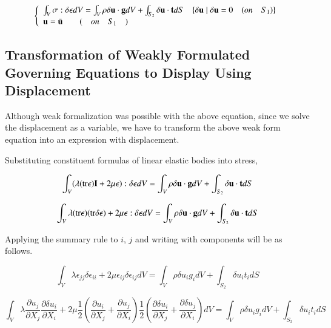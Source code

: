 \begin {tcolorbox}[title=Weakly Formulated Governing Equation]
\begin{equation}
\left\{\begin{array}{l}\int_V\mathbf{\sigma}:\delta\mathbf{\epsilon}dV=\int_V\rho\delta\mathbf{u}\cdot\mathbf{g}dV+\int_{S_2}\delta\mathbf{u}\cdot\mathbf{t}dS\quad\{ \delta\mathbf{u} \mid \delta\mathbf{u}=0 \quad (on \quad S_1) \}\\ \mathbf{u}=\bar{\mathbf{u}}\qquad (\quad on \quad S_1 \quad)\end{array}\right.
\end{equation}
\end{tcolorbox}

\subsection{Transformation of Weakly Formulated Governing Equations to Display Using Displacement}


Although weak formalization was possible with the above equation, since we solve the displacement as a variable, we have to transform the above weak form equation into an expression with displacement.

Substituting constituent formulas of linear elastic bodies into stress,

\begin{equation}
\int_V(\lambda({\rm tr}\mathbf{\epsilon})\mathbf{I}+2\mu\mathbf{\epsilon}):\delta\mathbf{\epsilon}dV=\int_V\rho\delta\mathbf{u}\cdot\mathbf{g}dV+\int_{S_2}\delta\mathbf{u}\cdot\mathbf{t}dS
\end{equation}

\begin{equation}
\int_V \lambda({\rm tr}\mathbf{\epsilon})({\rm tr}\mathbf{\delta\epsilon})+2\mu\mathbf{\epsilon}:\delta\mathbf{\epsilon}dV=\int_V\rho\delta\mathbf{u}\cdot\mathbf{g}dV+\int_{S_2}\delta\mathbf{u}\cdot\mathbf{t}dS
\end{equation}

Applying the summary rule to $i$, $j$ and writing with components will be as follows.

\begin{equation}
\int_V \lambda\epsilon_{jj}\delta\epsilon_{ii}+2\mu\epsilon_{ij}\delta\epsilon_{ij}dV=\int_V\rho\delta u_i g_idV+\int_{S_2}\delta u_i t_idS
\end{equation}

\begin{equation}
\int_V \lambda\frac{\partial u_j}{\partial X_j}\frac{\partial \delta u_i}{\partial X_i}+2\mu\frac{1}{2}\left(\frac{\partial u_i}{\partial X_j}+\frac{\partial u_j}{\partial X_i}\right)\frac{1}{2}\left(\frac{\partial \delta u_i}{\partial X_j}+\frac{\partial \delta u_j}{\partial X_i}\right)dV=\int_V\rho\delta u_i g_idV+\int_{S_2}\delta u_i t_idS
\end{equation}


